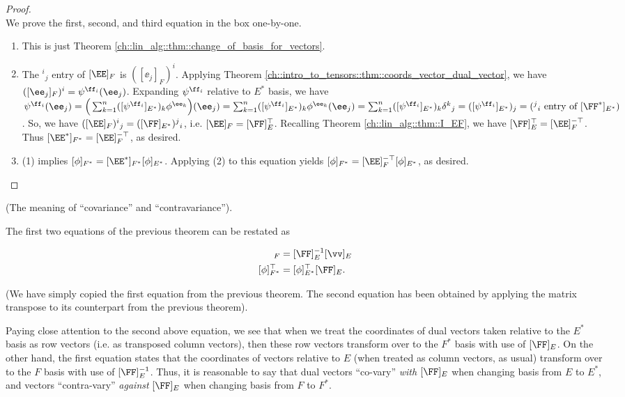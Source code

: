 \begin{proof} \mbox{} \\ \indent
    We prove the first, second, and third equation in the box one-by-one.

    \begin{enumerate}
        \item This is just Theorem \ref{ch::lin_alg::thm::change_of_basis_for_vectors}.
        
        \item The $^i{}_j$ entry of $[\EE]_F$ is $([\ee_j]_F)^i$. Applying Theorem \ref{ch::intro_to_tensors::thm::coords_vector_dual_vector}, we have $([\ee_j]_F)^i = \psi^{\ff_i}(\ee_j)$. Expanding $\psi^{\ff_i}$ relative to $E^*$ basis, we have $\psi^{\ff_i}(\ee_j) = \Big(\sum_{k = 1}^n ([\psi^{\ff_i}]_{E^*})_k \phi^{\ee_k} \Big)(\ee_j) = \sum_{k = 1}^n ([\psi^{\ff_i}]_{E^*})_k \phi^{\ee_k}(\ee_j) = \sum_{k = 1}^n ([\psi^{\ff_i}]_{E^*})_k \delta^k{}_j = ([\psi^{\ff_i}]_{E^*})_j = (\text{$^j{}_i$ entry of $[\FF^*]_{E^*}$})$. So, we have $([\EE]_F)^i{}_j = ([\FF]_{E^*})^j{}_i$, i.e. $[\EE]_F = [\FF]_E^\top$. Recalling Theorem \ref{ch::lin_alg::thm::I_EF}, we have $[\FF]_E^\top = [\EE]_F^{-\top}$. Thus $[\EE^*]_{F^*} = [\EE]_F^{-\top}$, as desired.

        \item (1) implies $[\phi]_{F^*} = [\EE^*]_{F^*} [\phi]_{E^*}$. Applying (2) to this equation yields $[\phi]_{F^*} = [\EE]_F^{-\top} [\phi]_{E^*}$, as desired.
    \end{enumerate}
\end{proof}

\begin{remark}
\label{ch::intro_to_tensors::rmk::covar_contarvar_real_meaning}

    (The meaning of ``covariance'' and ``contravariance'').

    The first two equations of the previous theorem can be restated as
    
    \begin{align*}
        [\vv]_F &= [\FF]_E^{-1} [\vv]_E \\
        [\phi]_{F^*}^\top &= [\phi]_{E^*}^\top [\FF]_E.
    \end{align*}
    
    (We have simply copied the first equation from the previous theorem. The second equation has been obtained by applying the matrix transpose to its counterpart from the previous theorem).
    
    Paying close attention to the second above equation, we see that when we treat the coordinates of dual vectors taken relative to the $E^*$ basis as row vectors (i.e. as transposed column vectors), then these row vectors transform over to the $F^*$ basis with use of $[\FF]_E$. On the other hand, the first equation states that the coordinates of vectors relative to $E$ (when treated as column vectors, as usual) transform over to the $F$ basis with use of $[\FF]_E^{-1}$. Thus, it is reasonable to say that dual vectors ``co-vary'' \textit{with} $[\FF]_E$ when changing basis from $E$ to $E^*$, and vectors ``contra-vary'' \textit{against} $[\FF]_E$ when changing basis from $F$ to $F^*$.
\end{remark}

